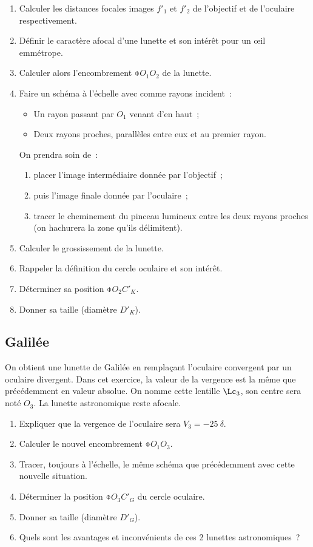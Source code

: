 \documentclass[../../main/main.tex]{subfiles}
\begin{document}
\begin{enumerate}
	\item Calculer les distances focales images $f'_1$ et $f'_2$ de l'objectif
	      et de l'oculaire respectivement.
	\item Définir le caractère afocal d'une lunette et son intérêt pour un
	      œil emmétrope.
	\item Calculer alors l'encombrement $\obar{O_1O_2}$ de la lunette.
	\item Faire un schéma à l'échelle avec comme rayons incident~:
	      \begin{itemize}
		      \item Un rayon passant par $O_1$ venant d'en haut~;
		      \item Deux rayons proches, parallèles entre eux et au premier rayon.
	      \end{itemize}
	      On prendra soin de~:
	      \begin{enumerate}
		      \item placer l'image intermédiaire donnée par l'objectif~;
		      \item puis l'image finale donnée par l'oculaire~;
		      \item tracer le cheminement du pinceau lumineux entre les deux
		            rayons proches (on hachurera la zone qu'ils délimitent).
	      \end{enumerate}
	\item Calculer le grossissement de la lunette.
	\item Rappeler la définition du cercle oculaire et son intérêt.
	\item Déterminer sa position $\obar{O_2C'_K}$.
	\item Donner sa taille (diamètre $D'_K$).
\end{enumerate}

\subsection{Galilée}

On obtient une lunette de Galilée en remplaçant l'oculaire convergent par un
oculaire divergent. Dans cet exercice, la valeur de la vergence est la même que
précédemment en valeur absolue. On nomme cette lentille $\Lc_3$, son centre sera
noté $O_3$. La lunette astronomique reste afocale.

\begin{enumerate}
	\item Expliquer que la vergence de l'oculaire sera $V_3 = \SI{-25}{\delta}$.
	\item Calculer le nouvel encombrement $\obar{O_1O_3}$.
	\item Tracer, toujours à l'échelle, le même schéma que précédemment avec
	      cette nouvelle situation.
	\item Déterminer la position $\obar{O_3C'_G}$ du cercle oculaire.
	\item Donner sa taille (diamètre $D'_G$).
	\item Quels sont les avantages et inconvénients de ces 2 lunettes
	      astronomiques~?
\end{enumerate}
\end{document}
